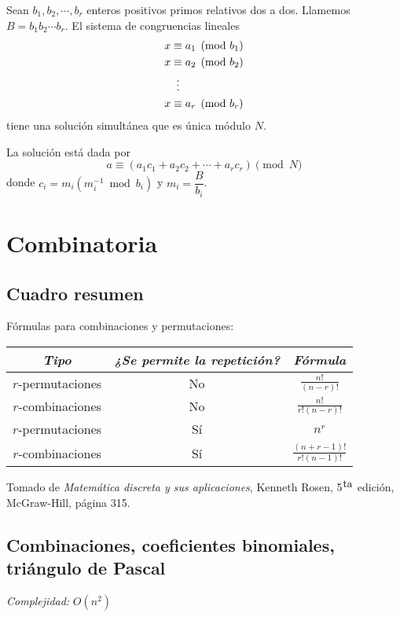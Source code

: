 \documentclass[10pt,letterpaper,twocolumn]{article}
\begin{document}
Sean $b_1, b_2, \cdots, b_{r}$ enteros positivos primos relativos dos a dos. Llamemos $B = b_1 b_2 \cdots b_r$. El sistema de congruencias lineales
\begin{align*}
  x & \equiv a_1 \pmod{b_1} \\
  x & \equiv  a_2 \pmod{b_2} \\
    & \mathrel{\makebox[\widthof{=}]{\vdots}} \\
  x & \equiv  a_r \pmod{b_r} \\
\end{align*}
tiene una solución simultánea que es única módulo $N$.

La solución está dada por
$$ a \equiv (a_1 c_1 + a_2 c_2 + \cdots + a_{r} c_{r}) \pmod{N} $$
donde $c_i = m_i (m_i^{-1} \bmod{b_i})$ y $m_i = \dfrac{B}{b_i}$.

\section{Combinatoria}
\subsection{Cuadro resumen}
Fórmulas para combinaciones y permutaciones:
\begin{center}
  \renewcommand{\arraystretch}{2} %
  \begin{tabular}{| c | c | c |}
    \hline
    \textit{Tipo} & \textit{¿Se permite la repetición?} & \textit{Fórmula} \\ [1.5ex]
    \hline\hline

    $r$-permutaciones & No & $ \displaystyle\frac{n!}{(n-r)!} $ \\ [1.5ex]
    \hline
    $r$-combinaciones & No & $ \displaystyle\frac{n!}{r!(n-r)!} $ \\  [1.5ex]
    \hline
    $r$-permutaciones & Sí & $ \displaystyle n^{r} $ \\
    \hline
    $r$-combinaciones & Sí & $ \displaystyle\frac{(n+r-1)!}{r!(n-1)!} $ \\ [1.5ex]
    \hline
  \end{tabular}
  \renewcommand{\arraystretch}{1}
\end{center}
Tomado de \textit{Matemática discreta y sus aplicaciones}, Kenneth Rosen, 5${}^{\hbox{ta}}$ edición, McGraw-Hill, página 315.

\subsection{Combinaciones, coeficientes binomiales, triángulo de Pascal}
\emph{Complejidad:} $ O(n^2) $
\end{document}
